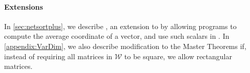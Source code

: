 \documentclass[main.tex]{subfiles}
\begin{document}
\paragraph{Extensions}
In \cref{sec:netsortplus}, we describe \netsortplus{}, an extension to \netsort{} by allowing programs to compute the average coordinate of a vector, and use such scalars in .
In \cref{appendix:VarDim}, we also describe modification to the Master Theorems if, instead of requiring all matrices in $\mathcal W$ to be square, we allow rectangular matrices.
\end{document}
